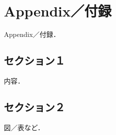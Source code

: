 \chapter*{Appendix／付録} %

Appendix／付録．

\setcounter{section}{0} %
\renewcommand{\thesection}{\Alph{section}} %
\setcounter{equation}{0} %
\renewcommand{\theequation}{\Alph{section}.\arabic{equation}}
\setcounter{figure}{0} %
\renewcommand{\thefigure}{\Alph{section}.\arabic{figure}}
\setcounter{table}{0} %
\renewcommand{\thetable}{\Alph{section}.\arabic{table}}

\section{セクション１}
内容．

\section{セクション２}
図／表など．
